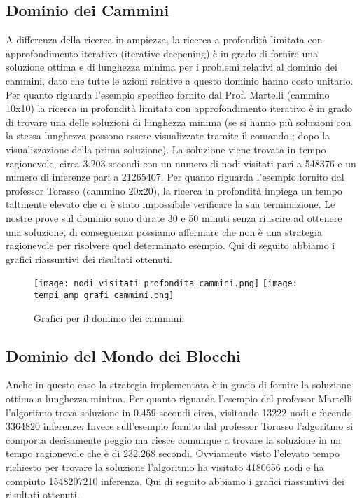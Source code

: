 \subsection{Dominio dei Cammini}
A differenza della ricerca in ampiezza, la ricerca a profondità limitata con approfondimento iterativo (iterative deepening) è in grado di fornire una soluzione ottima e di lunghezza minima per i problemi relativi al dominio dei cammini, dato che tutte le azioni relative a questo dominio hanno costo unitario. Per quanto riguarda l'esempio specifico fornito dal Prof. Martelli (cammino 10x10) la ricerca in profondità limitata con approfondimento iterativo è in grado di trovare una delle soluzioni di lunghezza minima (se si hanno più soluzioni con la stessa lunghezza possono essere visualizzate tramite il comando ; dopo la visualizzazione della prima soluzione). La soluzione viene trovata in tempo ragionevole, circa 3.203 secondi con un numero di nodi visitati pari a 548376 e un numero di inferenze pari a 21265407. Per quanto riguarda l'esempio fornito dal professor Torasso (cammino 20x20), la ricerca in profondità impiega un tempo taltmente elevato che ci è stato impossibile verificare la sua terminazione. Le nostre prove sul dominio sono durate 30 e 50 minuti senza riuscire ad ottenere una soluzione, di conseguenza possiamo affermare che non è una strategia ragionevole per risolvere quel determinato esempio.
Qui di seguito abbiamo i grafici riassuntivi dei risultati ottenuti.

\begin{landscape}
\begin{sidewaysfigure}
\centering
{\texttt{[image: nodi\_visitati\_profondita\_cammini.png]}}\qquad\qquad
{\texttt{[image: tempi\_amp\_grafi\_cammini.png]}}\qquad\qquad
\caption{Grafici per il dominio dei cammini.}
\end{sidewaysfigure}
\end{landscape}

\subsection{Dominio del Mondo dei Blocchi}
Anche in questo caso la strategia implementata è in grado di fornire la soluzione ottima a lunghezza minima. Per quanto riguarda l'esempio del professor Martelli l'algoritmo trova soluzione in 0.459 secondi circa, visitando 13222 nodi e facendo 3364820 inferenze. Invece sull'esempio fornito dal professor Torasso l'algoritmo si comporta decisamente peggio ma riesce comunque a trovare la soluzione in un tempo ragionevole che è di 232.268 secondi. Ovviamente visto l'elevato tempo richiesto per trovare la soluzione l'algoritmo ha visitato 4180656 nodi e ha compiuto 1548207210 inferenza.
Qui di seguito abbiamo i grafici riassuntivi dei risultati ottenuti.

